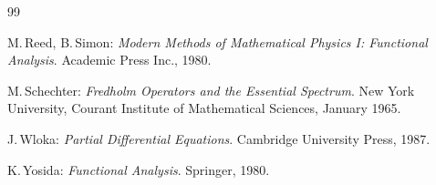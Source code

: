 \documentclass[11pt,twoside]{article}
\begin{document}
\begin{thebibliography}{99}
\begin{small}
 M.\,Reed, B.\,Simon:
\textit{Modern Methods of Mathematical Physics I: Functional Analysis}.
Academic Press Inc., 1980.

  M.\,Schechter:
\textit{Fredholm Operators and the Essential Spectrum}.
New York University, Courant Institute of Mathematical Sciences,
January 1965.


  J.\,Wloka:
\textit{Partial Differential Equations}.
Cambridge University Press, 1987.

  K.\,Yosida:
\textit{Functional Analysis}.
Springer, 1980.
\end{small}
\end{thebibliography}

\end{document}

